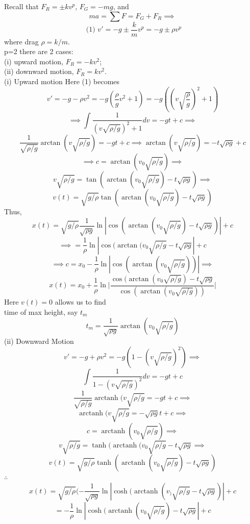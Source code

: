 \documentclass[10pt,a4paper]{article}
\DeclareMathOperator\arctanh{arctanh}
\begin{document}

  \newpage
  Recall that \(F_R = \pm kv^p  \), \( F_G = -mg \), and 
  \[ ma = \sum F = F_G + F_R \implies \]
  \[ \text{ (1) } v' = -g \pm \frac{k}{m} v^p = -g \pm \rho v^p \]
  where drag \( \rho = k/m \).\\
  p=2 there are 2 cases: \\
  (i) upward motion, \( F_R = -kv^2 \);\\
  (ii) downward motion, \( F_R = kv^2 \).\\[5mm]
  (i) Upward motion
  Here (1) becomes 
  \[ v' = -g-\rho v^2 = -g( \frac{\rho}{g} v^2 + 1) = -g((v \sqrt{
  \frac{\rho}{g}})^2+1) \]
  \[ \implies \int \frac{1}{(v \sqrt{\rho/g})^2 + 1} dv = -gt + c \implies \]
  \[ \frac{1}{ \sqrt{\rho/g}} \arctan(v \sqrt{\rho/g}) = -gt + c \implies
  \arctan  (v \sqrt{\rho/g}) = -t \sqrt{\rho g} + c \]
  \[ \implies c = \arctan (v_0 \sqrt{\rho/g}) \implies \]
  \[ v \sqrt{\rho/g} = \tan ( \arctan (v_0\sqrt{\rho/g}) - t \sqrt{\rho g})
  \implies\]
  \[ \boxed{v(t) = \sqrt{g/ \rho} \tan ( \arctan( v_0\sqrt{\rho/g}) - t
  \sqrt{\rho g})} \]
  Thus, 
  \[ x(t) = \sqrt{g/\rho} \frac{1}{ \sqrt{\rho g}} \ln | \cos(\arctan(v_0
  \sqrt{\rho/g}) -t \sqrt{\rho g})| + c \]
  \[ \implies = \frac{1}{\rho} \ln | \cos (\arctan(v_0 \sqrt{\rho/g} - t
  \sqrt{\rho g}| +c \]
  \[\implies c = x_0 - \frac{1}{\rho} \ln | \cos ( \arctan (v_0 \sqrt{\rho/g}))|
  \implies \]
  \[ \boxed{ x(t) = x_0 + \frac{1}{\rho} \ln \bigg| \frac{\cos(\arctan(v_0
  \sqrt{\rho/g}) -t \sqrt{\rho g}}{\cos (\arctan (v_0 \sqrt{\rho/g}))}
  \bigg|}  \]
  Here \( v(t) = 0 \) allows us to find \\
  time of max height, say \( t_m \)
  \[ \boxed{ t_m = \frac{1}{ \sqrt{\rho g}} \arctan(v_0 \sqrt{\rho /g})} \]
  (ii) Downward Motion
  \[ v' = -g+\rho v^2 = -g(1 - (v \sqrt{\rho/g})^2) \implies \]
  \[ \int \frac{1}{1 - (v \sqrt{\rho/g})^2}dv = -gt + c \] %
  \[ \frac{1}{ \sqrt{\rho/g}} \arctanh (v \sqrt{\rho/g} = -gt + c \implies
  \] 
  \[ \arctanh (v \sqrt{\rho/g} = - \sqrt{\rho g} t + c \implies \]
  \[ c = \arctanh ( v_0 \sqrt{\rho/g} ) \implies \]
  \[ v \sqrt{\rho/g} = \tanh ( \arctanh(v_0 \sqrt{\rho/g} - t \sqrt{\rho g}
  \implies\]
  \[ \boxed{ v(t) = \sqrt{g/\rho} \tanh ( \arctanh (v_0 \sqrt{\rho/g})-t
  \sqrt{\rho g})} \]
  \( \therefore \)
  \[ x(t)= \sqrt{g/\rho}( -\frac{1}{ \sqrt{\rho g}} \ln | \cosh ( \arctanh
  (v_) \sqrt{\rho/g} -t \sqrt{\rho g}) | + c\]
  \[ = -\frac{1}{\rho} \ln | \cosh ( \arctanh (v_0 \sqrt{\rho/g}) - t
  \sqrt{\rho g}| + c \]
\end{document}
